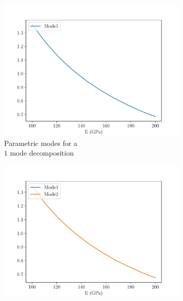 
\begin{figure}
    \begin{subfigure}{0.3\linewidth}
        \centering
        \includegraphics[width=\linewidth]{Figures/Para_modes1.pdf}
        \caption{Parametric modes for a \\$1$ mode decomposition}
    \end{subfigure}
    \begin{subfigure}{0.3\linewidth}
        \centering
        \includegraphics[width=\linewidth]{Figures/Para_modes2.pdf}

\end{subfigure}
\end{figure}
